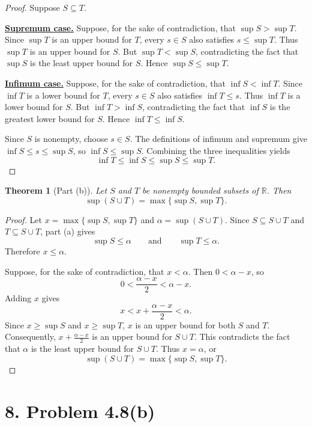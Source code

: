 \documentclass[11pt]{article}
\newtheorem{theorem}{Theorem}
\begin{document}
\begin{proof}
Suppose \(S\subseteq T\).

\noindent\underline{\textbf{Supremum case.}}
Suppose, for the sake of contradiction, that \(\sup S>\sup T\).
Since \(\sup T\) is an upper bound for \(T\), every \(s\in S\) also satisfies \(s\leq\sup T\).
Thus \(\sup T\) is an upper bound for \(S\).
But \(\sup T<\sup S\), contradicting the fact that \(\sup S\) is the least upper bound for \(S\).
Hence \(\sup S\leq\sup T\).

\noindent\underline{\textbf{Infimum case.}}
Suppose, for the sake of contradiction, that \(\inf S<\inf T\).
Since \(\inf T\) is a lower bound for \(T\), every \(s\in S\) also satisfies \(\inf T\leq s\).
Thus \(\inf T\) is a lower bound for \(S\).
But \(\inf T>\inf S\), contradicting the fact that \(\inf S\) is the greatest lower bound for \(S\).
Hence \(\inf T\leq\inf S\).

Since \(S\) is nonempty, choose \(s\in S\).
The definitions of infimum and supremum give \(\inf S\leq s\leq\sup S\), so \(\inf S\leq\sup S\).
Combining the three inequalities yields
\[
\inf T\leq\inf S\leq\sup S\leq\sup T.
\]
\end{proof}

\begin{theorem}[Part (b)]
Let \(S\) and \(T\) be nonempty bounded subsets of \(\mathbb{R}\).
Then
\[
\sup(S\cup T)=\max\{\sup S,\sup T\}.
\]
\end{theorem}

\begin{proof}
Let \(x=\max\{\sup S,\sup T\}\) and \(\alpha=\sup(S\cup T)\).
Since \(S\subseteq S\cup T\) and \(T\subseteq S\cup T\), part (a) gives
\[
\sup S\leq\alpha
\qquad\text{and}\qquad
\sup T\leq\alpha.
\]
Therefore \(x\leq\alpha\).

Suppose, for the sake of contradiction, that \(x<\alpha\).
Then \(0<\alpha-x\), so
\[
0<\frac{\alpha-x}{2}<\alpha-x.
\]
Adding \(x\) gives
\[
x<x+\frac{\alpha-x}{2}<\alpha.
\]
Since \(x\geq\sup S\) and \(x\geq\sup T\), \(x\) is an upper bound for both \(S\) and \(T\).
Consequently, \(x+\frac{\alpha-x}{2}\) is an upper bound for \(S\cup T\).
This contradicts the fact that \(\alpha\) is the least upper bound for \(S\cup T\).
Thus \(x=\alpha\), or
\[
\sup(S\cup T)=\max\{\sup S,\sup T\}.
\]
\end{proof}

\section*{8. Problem 4.8(b)}
\end{document}
